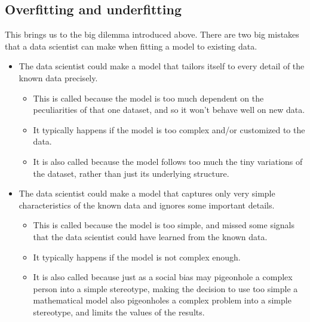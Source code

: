 \documentclass[letterpaper,10pt,english]{sphinxmanual}
\begin{document}
\subsection{Overfitting and underfitting}
\label{\detokenize{chapter-17-machine-learning:overfitting-and-underfitting}}
This brings us to the big dilemma introduced above.  There are two big mistakes that a data scientist can make when fitting a model to existing data.
\begin{itemize}
\item {} 
The data scientist could make a model that tailors itself to every detail of the known data precisely.
\begin{itemize}
\item {} 
This is called  because the model is too much dependent on the peculiarities of that one dataset, and so it won’t behave well on new data.

\item {} 
It typically happens if the model is too complex and/or customized to the data.

\item {} 
It is also called  because the model follows too much the tiny variations of the dataset, rather than just its underlying structure.

\end{itemize}

\item {} 
The data scientist could make a model that captures only very simple characteristics of the known data and ignores some important details.
\begin{itemize}
\item {} 
This is called  because the model is too simple, and missed some signals that the data scientist could have learned from the known data.

\item {} 
It typically happens if the model is not complex enough.

\item {} 
It is also called  because just as a social bias may pigeonhole a complex person into a simple stereotype, making the decision to use too simple a mathematical model also pigeonholes a complex problem into a simple stereotype, and limits the values of the results.

\end{itemize}

\end{itemize}
\end{document}

